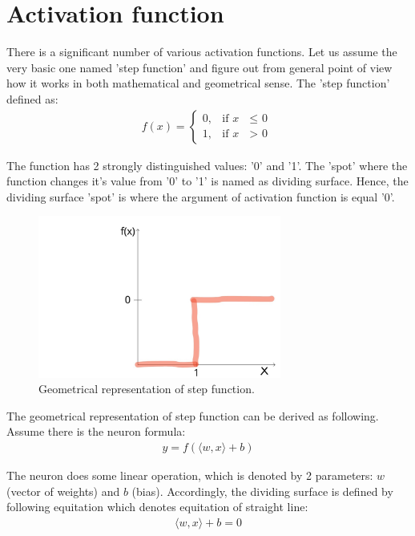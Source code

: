 \section{Activation function}
There is a significant number of various activation functions. Let us assume the very basic one named 'step function' and figure out from general point of view how it works in both mathematical and geometrical sense.   
The 'step function' defined as:
\begin{align*}
f(x) = \begin{cases} 0, & \mbox{if } x\mbox{ $\leq$ 0} \\ 1, & \mbox{if } x\mbox{ $>$ 0} \end{cases}
\end{align*}

The function has 2 strongly distinguished values: '0' and '1'. The 'spot' where the function changes it's value from '0' to '1' is named as dividing surface. Hence, the dividing surface 'spot' is where the argument of activation function is equal '0'.

\begin{figure}[h]
    \centering \includegraphics[width=8cm]{images/step_function.jpg}
    \caption {Geometrical representation of step function.}
\end{figure}

The geometrical representation of step function can be derived as following. Assume there is the neuron formula:
\begin{align*}
y = f(\langle w, x \rangle + b)
\end{align*}

The neuron does some linear operation, which is denoted by 2 parameters: $w$ (vector of weights) and $b$ (bias). Accordingly, the dividing surface is defined by following equitation which denotes equitation of straight line:
\begin{align*}
\langle w, x \rangle + b = 0
\end{align*}

